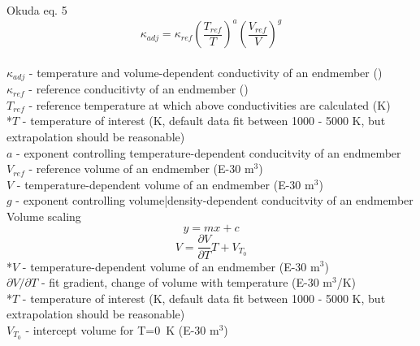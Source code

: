 Okuda eq. 5 $$\kappa_{adj}=\kappa_{ref}\left ( \frac{T_{ref}}{T} \right )^{a}\left ( \frac{V_{ref}}{V} \right )^{g}$$      
\\ $\kappa_{adj}$ - temperature and volume-dependent conductivity of an endmember (\wmk)\\
$\kappa_{ref}$ - reference conducitivty of an endmember (\wmk)\\
$T_{ref}$ - reference temperature at which above conductivities are calculated (K)\\
*$T$ - temperature of interest (K, default data fit between 1000 - 5000 K, but extrapolation should be reasonable)\\   
$a$ - exponent controlling temperature-dependent conducitvity of an endmember\\
$V_{ref}$ - reference volume of an endmember (E-30 m$^3$)\\
$V$ - temperature-dependent volume of an endmember (E-30 m$^3$)\\
$g$ - exponent controlling volume|density-dependent conducitvity of an endmember\\


Volume scaling $$y=mx+c$$ $$V=\frac{\partial V}{\partial T} T+V_{T_{0}}$$                    
*$V$ - temperature-dependent volume of an endmember (E-30 m$^3$)\\          
${\partial V}/{\partial T}$ - fit gradient, change of volume with temperature (E-30 m$^3$/K)\\
*$T$ - temperature of interest (K, default data fit between 1000 - 5000 K, but extrapolation should be reasonable)\\
$V_{T_{0}}$ - intercept volume for T=0~K (E-30 m$^3$)
                     
\pagebreak